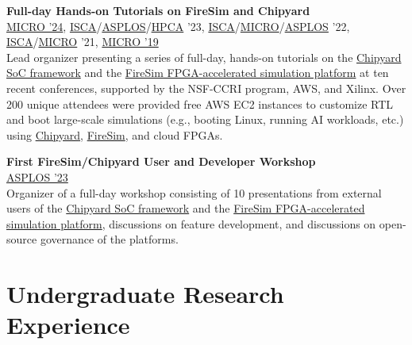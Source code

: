 \documentclass[line]{res}
\begin{document}
\begin{resume}
\textbf{Full-day Hands-on Tutorials on FireSim and Chipyard}
\\
\href{https://fires.im/micro-2024-tutorial/}{MICRO '24}, \href{https://fires.im/isca-2023-tutorial/}{ISCA}/\href{https://fires.im/asplos-2023-tutorial/}{ASPLOS}/\href{https://fires.im/hpca-2023-tutorial/}{HPCA} '23, \href{https://fires.im/isca-2022-tutorial/}{ISCA}/\href{https://fires.im/micro-2022-tutorial/}{MICRO}/\href{https://fires.im/asplos-2022-tutorial/}{ASPLOS} '22, \href{https://fires.im/isca-2021-tutorial/}{ISCA}/\href{https://fires.im/micro-2021-tutorial/}{MICRO} '21, \href{https://fires.im/micro-2019-tutorial/}{MICRO '19}
\vspace{0.5mm}
\\
Lead organizer presenting a series of full-day, hands-on tutorials on the \hyperref[sec:chipyard]{Chipyard SoC framework} and the \hyperref[sec:firesim]{FireSim FPGA-accelerated simulation platform} at ten recent conferences, supported by the NSF-CCRI program, AWS, and Xilinx.
Over 200 unique attendees were provided free AWS EC2 instances to customize RTL and boot large-scale simulations (e.g., booting Linux, running AI workloads, etc.) using \hyperref[sec:chipyard]{Chipyard}, \hyperref[sec:firesim]{FireSim}, and cloud FPGAs.

\pagebreak

\textbf{First FireSim/Chipyard User and Developer Workshop}
\\
\href{https://fires.im/workshop-2023/}{ASPLOS '23}
\vspace{0.5mm}
\\
Organizer of a full-day workshop consisting of 10 presentations from external users of the \hyperref[sec:chipyard]{Chipyard SoC framework} and the \hyperref[sec:firesim]{FireSim FPGA-accelerated simulation platform}, discussions on feature development, and discussions on open-source governance of the platforms.

\section{\Large{Undergraduate Research Experience}}
\label{sec:ugradexp}
\vspace{2mm}


\end{resume}
\end{document}
